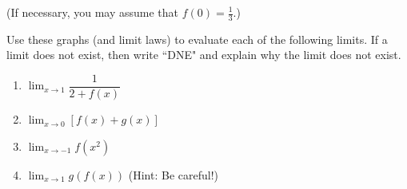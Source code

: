 \documentclass[12pt]{exam}
\begin{document}
(If necessary, you may assume that $f(0)=\frac{1}{3}$.)

Use these graphs (and limit laws) to evaluate each of the following limits. If a limit does not exist, then write ``DNE" and explain why the limit does not exist. 

\begin{enumerate}

\item[(a)] $\displaystyle\lim_{x\to 1} \dfrac{1}{2+f(x)}$

\vfill

\item[(b)] $\displaystyle\lim_{x\to 0}[f(x)+g(x)]$

\vfill

\item[(c)] $\displaystyle\lim_{x\to -1} f(x^2)$

\vfill

\item[(d)] $\displaystyle\lim_{x\to 1} g(f(x))$  (Hint: Be careful!)

\vfill

\end{enumerate}



\end{document}
